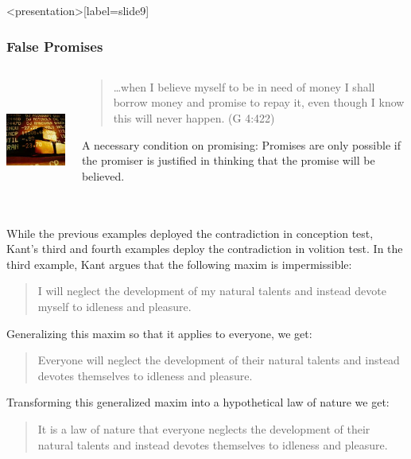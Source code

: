 \begin{frame}<presentation>[label=slide9]
    \frametitle{False Promises}
        \begin{columns}
            \begin{column}{4cm}
                \includegraphics[height=4cm]{../../graphics/false_promises.jpg}
            \end{column}
            \begin{column}{6cm}
                \begin{quote}
                    \ldots when I believe myself to be in need of money I shall borrow money and promise to repay it, even though I know this will never happen. (G 4:422)
                \end{quote}
                \alert{A necessary condition on promising}: Promises are only possible if the promiser is justified in thinking that the promise will be believed.
            \end{column}
        \end{columns}
\end{frame}

While the previous examples deployed the contradiction in conception test, Kant's third and fourth examples deploy the contradiction in volition test. In the third example, Kant argues that the following maxim is impermissible:

\begin{quote}
	I will neglect the development of my natural talents and instead devote myself to idleness and pleasure.
\end{quote}

Generalizing this maxim so that it applies to everyone, we get:

\begin{quote}
	Everyone will neglect the development of their natural talents and instead devotes themselves to idleness and pleasure.
\end{quote}

Transforming this generalized maxim into a hypothetical law of nature we get:

\begin{quote}
	It is a law of nature that everyone neglects the development of their natural talents and instead devotes themselves to idleness and pleasure.
\end{quote}

